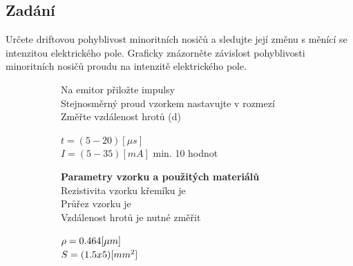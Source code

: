 \documentclass{article}
\begin{document}


\subsection*{Zadání}
Určete driftovou pohyblivost minoritních nosičů a sledujte její změnu s měnící se intenzitou elektrického pole.
Graficky znázorněte závislost pohyblivosti minoritních nosičů proudu na intenzitě elektrického pole.
\begin{figure}[H]
    \hspace{0.05\textwidth}
    \begin{minipage}[t]{0.9\textwidth}
        \begin{figure}[H]
            \begin{minipage}[t]{0.6\textwidth}
                Na emitor přiložte impulsy\\
                Stejnosměrný proud vzorkem nastavujte v rozmezí\\
                Změřte vzdálenost hrotů (d)\\
            \end{minipage}
            \hfill
            \begin{minipage}[t]{0.4\textwidth}
                \(t = (5 - 20) [\mu s] \)\\
                \(I = (5 - 35) [mA] \) min. 10 hodnot\\
            \end{minipage}
        \end{figure}
    \end{minipage}
    
    \hspace{0.05\textwidth}
    \begin{minipage}[t]{0.9\textwidth}
        \begin{figure}[H]
            \begin{minipage}[t]{0.6\textwidth}
                \textbf{ Parametry vzorku a použitých materiálů}\\
                Rezistivita vzorku křemíku je \\
                Průřez vzorku je\\
                Vzdálenost hrotů je nutné změřit\\
            \end{minipage}
            \hfill
            \begin{minipage}[t]{0.4\textwidth}
                \vspace{1.5mm}
                \(\rho = 0.464\-[\mu m]\)\\
                \(S = (1.5 x 5)\-[mm^2]\)\\
            \end{minipage}
        \end{figure}
    \end{minipage}
\end{figure}
\end{document}
